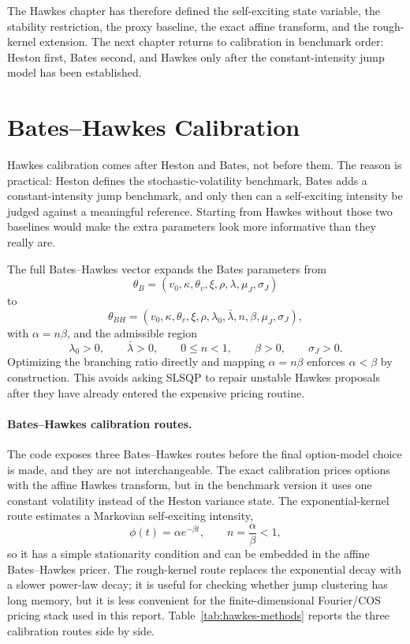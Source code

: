 \documentclass[a4paper,10pt,titlepage,oneside,openany]{book}
\theoremstyle{plain}
\theoremstyle{definition}
\theoremstyle{remark}
\begin{document}
The Hawkes chapter has therefore defined the self-exciting state variable, the stability restriction, the proxy baseline, the exact affine transform, and the rough-kernel extension. The next chapter returns to calibration in benchmark order: Heston first, Bates second, and Hawkes only after the constant-intensity jump model has been established.


\section{Bates--Hawkes Calibration}

Hawkes calibration comes after Heston and Bates, not before them. The reason is practical: Heston defines the stochastic-volatility benchmark, Bates adds a constant-intensity jump benchmark, and only then can a self-exciting intensity be judged against a meaningful reference. Starting from Hawkes without those two baselines would make the extra parameters look more informative than they really are.

The full Bates--Hawkes vector expands the Bates parameters from
\[
    \theta_B=(v_0,\kappa,\theta_v,\xi,\rho,\lambda,\mu_J,\sigma_J)
\]
to
\[
    \theta_{BH}
    =
    (v_0,\kappa,\theta_v,\xi,\rho,\lambda_0,\bar{\lambda},n,\beta,\mu_J,\sigma_J),
\]
with \(\alpha=n\beta\), and the admissible region
\[
    \lambda_0>0,\qquad \bar{\lambda}>0,\qquad 0\leq n<1,\qquad \beta>0,\qquad \sigma_J>0.
\]
Optimizing the branching ratio directly and mapping \(\alpha=n\beta\) enforces \(\alpha<\beta\) by construction. This avoids asking SLSQP to repair unstable Hawkes proposals after they have already entered the expensive pricing routine.

\paragraph{Bates--Hawkes calibration routes.}
The code exposes three Bates--Hawkes routes before the final option-model choice is made, and they are not interchangeable. The exact calibration prices options with the affine Hawkes transform, but in the benchmark version it uses one constant volatility instead of the Heston variance state. The exponential-kernel route estimates a Markovian self-exciting intensity,
\[
    \phi(t)=\alpha e^{-\beta t}, \qquad n=\frac{\alpha}{\beta}<1,
\]
so it has a simple stationarity condition and can be embedded in the affine Bates--Hawkes pricer. The rough-kernel route replaces the exponential decay with a slower power-law decay; it is useful for checking whether jump clustering has long memory, but it is less convenient for the finite-dimensional Fourier/COS pricing stack used in this report. Table~\ref{tab:hawkes-methods} reports the three calibration routes side by side.
\end{document}
